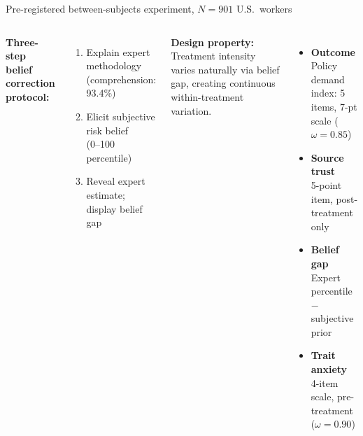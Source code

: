 \documentclass[aspectratio=169,11pt]{beamer}
\begin{document}
\begin{frame}{Pre-registered between-subjects experiment, $N = 901$ U.S.\ workers}

\begin{columns}[T]
\textbf{Three-step belief correction protocol:}
\begin{enumerate}
    \item Explain expert methodology \\ {\small (comprehension: 93.4\%)}
    \item Elicit subjective risk belief \\ {\small (0--100 percentile)}
    \item Reveal expert estimate; display belief gap
\end{enumerate}

\vspace{0.3cm}
{\small \textcolor{sbugreen}{\textbf{Design property:}} Treatment intensity varies naturally via belief gap, creating continuous within-treatment variation.}

\begin{itemize}
    \item \textbf{Outcome} \\
    {\small Policy demand index: 5 items, 7-pt scale ($\omega = 0.85$)}
    \item \textbf{Source trust} \\
    {\small 5-point item, post-treatment only}
    \item \textbf{Belief gap} \\
    {\small Expert percentile $-$ subjective prior}
    \item \textbf{Trait anxiety} \\
    {\small 4-item scale, pre-treatment ($\omega = 0.90$)}
\end{itemize}
\end{columns}

\end{frame}
\end{document}
